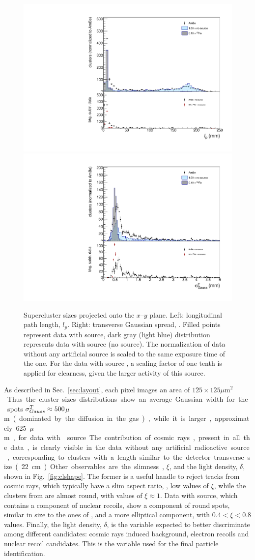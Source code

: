 \begin{figure}[ht]
  \begin{center}
  \includegraphics[width=0.45\linewidth]{figures/length}
  \includegraphics[width=0.45\linewidth]{figures/tgausssigma}

  \caption{Supercluster sizes projected onto the $x$--$y$ plane. Left:
    longitudinal path length, $l_p$.  Right: transverse Gaussian
    spread, \tsigmag. Filled points represent data with \ambe source,
    dark gray (light blue) distribution represents data with \fe
    source (no source).  The normalization of data without any artificial source is scaled
    to the same exposure time of the \ambe one. For the data with \fe source ,
    a scaling factor of one tenth is applied for clearness, given the
    larger activity of this source.  \label{fig:clsize}}

    \end{center}
\end{figure}

As described in Sec.~\ref{sec:layout}, each pixel images an area of
$125\times125$\unit{$\mu$m$^2$}. Thus the cluster sizes distributions
show an average Gaussian width for the \fe spots
$\sigma^T_{Gauss}\approx500$\unit{$\mu$m} (dominated by the diffusion in the
gas), while it is larger, approximately 625\unit{$\mu$m}, for data
with \ambe source.  The contribution of cosmic rays, present in all
the data, is clearly visible in the data without any artificial radioactive
source, corresponding to clusters with a length similar to the detector transverse
size (22\unit{cm}).

Other observables  are the slimness,
$\xi$, and the light density, $\delta$, shown in
Fig.~\ref{fig:clshape}. The former is a useful handle to reject tracks
from cosmic rays, which  typically have  a slim aspect ratio, \ie, low
values of $\xi$, while the clusters from \fe are almost round, with
values of $\xi\approx 1$. Data with \ambe source, which contains  a
component of nuclear recoils, show a component of round spots,
similar in size to the ones of \fe, and a more elliptical component,
with $0.4<\xi<0.8$ values. Finally, the light density, $\delta$, is the
variable expected to better discriminate among different
candidates: cosmic rays induced background, electron recoils and
nuclear recoil candidates. This is the variable used for the final
particle identification.

